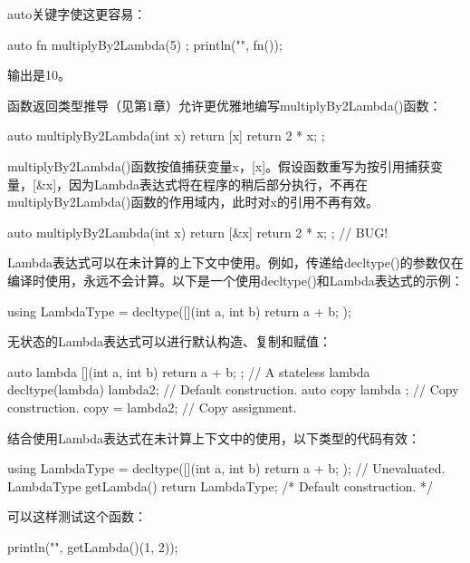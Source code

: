auto关键字使这更容易：

\begin{cpp}
auto fn { multiplyBy2Lambda(5) };
println("{}", fn());
\end{cpp}

输出是10。

函数返回类型推导（见第1章）允许更优雅地编写multiplyBy2Lambda()函数：

\begin{cpp}
auto multiplyBy2Lambda(int x)
{
    return [x]{ return 2 * x; };
}
\end{cpp}

multiplyBy2Lambda()函数按值捕获变量x，[x]。假设函数重写为按引用捕获变量，[\&x]，因为Lambda表达式将在程序的稍后部分执行，不再在multiplyBy2Lambda()函数的作用域内，此时对x的引用不再有效。

\begin{cpp}
auto multiplyBy2Lambda(int x)
{
    return [&x]{ return 2 * x; }; // BUG!
}
\end{cpp}


Lambda表达式可以在未计算的上下文中使用。例如，传递给decltype()的参数仅在编译时使用，永远不会计算。以下是一个使用decltype()和Lambda表达式的示例：

\begin{cpp}
using LambdaType = decltype([](int a, int b) { return a + b; });
\end{cpp}


无状态的Lambda表达式可以进行默认构造、复制和赋值：

\begin{cpp}
auto lambda { [](int a, int b) { return a + b; } }; // A stateless lambda
decltype(lambda) lambda2; // Default construction.
auto copy { lambda }; // Copy construction.
copy = lambda2; // Copy assignment.
\end{cpp}

结合使用Lambda表达式在未计算上下文中的使用，以下类型的代码有效：

\begin{cpp}
using LambdaType = decltype([](int a, int b) { return a + b; }); // Unevaluated.
LambdaType getLambda() { return LambdaType{}; /* Default construction. */ }
\end{cpp}

可以这样测试这个函数：

\begin{cpp}
println("{}", getLambda()(1, 2));
\end{cpp}

